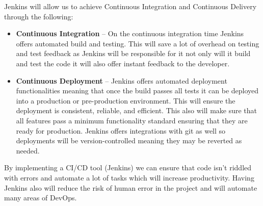 \documentclass{article}
\begin{document}
Jenkins will allow us to achieve Continuous Integration and Continuous Delivery through the following:
\begin{itemize}
  \item \textbf{Continuous Integration} -- On the continuous integration time Jenkins offers automated build and testing. This will save a lot of overhead on testing and test feedback as Jenkins will be responsible for it not only will it build and test the code it will also offer instant feedback to the developer.
  \item \textbf{Continuous Deployment} -- Jenkins offers automated deployment functionalities meaning that once the build passes all tests it can be deployed into a production or pre-production environment. This will ensure the deployment is consistent, reliable, and efficient. This also will make sure that all features pass a minimum functionality standard ensuring that they are ready for production. Jenkins offers integrations with git as well so deployments will be version-controlled meaning they may be reverted as needed.
\end{itemize}

By implementing a CI/CD tool (Jenkins) we can ensure that code isn't riddled with errors and automate a lot of tasks which will increase productivity. Having Jenkins also will reduce the risk of human error in the project and will automate many areas of DevOps.
\end{document}
